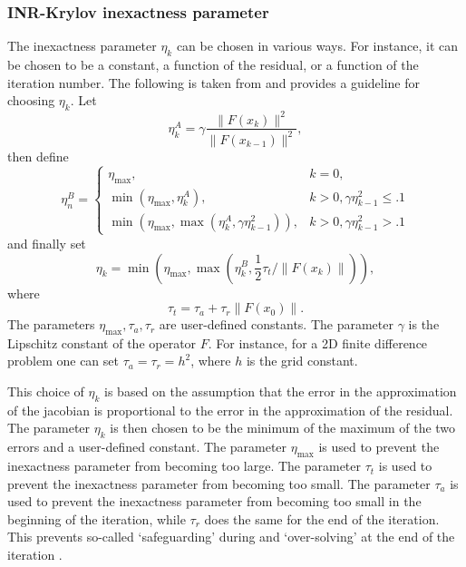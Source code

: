 \subsubsection{INR-Krylov inexactness parameter}\label{sec:inr_krylov_inexactness}
The inexactness parameter $\eta_k$ can be chosen in various ways. For instance, it can be chosen to be a constant, a function of the residual, or a function of the iteration number. The following is taken from \cite[Equations 6.19 and 6.20]{nonlinear_cg_Kelley_1995} and provides a guideline for choosing $\eta_k$. Let
\[
  \eta_k^A = \gamma \frac{\| F(x_k) \|^2}{\|F(x_{k-1})\|^2},
\]
then define
\begin{equation*}
  \eta_n^B=
  \begin{cases}
    \eta_{\max },                                                                    & k=0,                             \\
    \min \left(\eta_{\max }, \eta_k^A\right),                                        & k>0, \gamma \eta_{k-1}^2 \leq .1 \\
    \min \left(\eta_{\max }, \max \left(\eta_k^A, \gamma \eta_{k-1}^2\right)\right), & k>0, \gamma \eta_{k-1}^2>.1
  \end{cases}
\end{equation*}
and finally set
\begin{equation}
  \eta_k = \min \left(\eta_{\max }, \max \left(\eta_k^B, \frac{1}{2}\tau_t/\|F(x_k)\|\right)\right),
\end{equation}
where 
\[
  \tau_t = \tau_a + \tau_r \|F(x_0)\|.
\]
The parameters $\eta_{\max}, \tau_a, \tau_r$ are user-defined constants. The parameter $\gamma$ is the Lipschitz constant of the operator $F$. For instance, for a 2D finite difference problem one can set $\tau_a =\tau_r = h^2$, where $h$ is the grid constant.

This choice of $\eta_k$ is based on the assumption that the error in the approximation of the jacobian is proportional to the error in the approximation of the residual. The parameter $\eta_k$ is then chosen to be the minimum of the maximum of the two errors and a user-defined constant. The parameter $\eta_{\max}$ is used to prevent the inexactness parameter from becoming too large. The parameter $\tau_t$ is used to prevent the inexactness parameter from becoming too small. The parameter $\tau_a$ is used to prevent the inexactness parameter from becoming too small in the beginning of the iteration, while $\tau_r$ does the same for the end of the iteration. This prevents so-called `safeguarding' during and `over-solving' at the end of the iteration \cite[Section 6.3]{nonlinear_cg_Kelley_1995}.